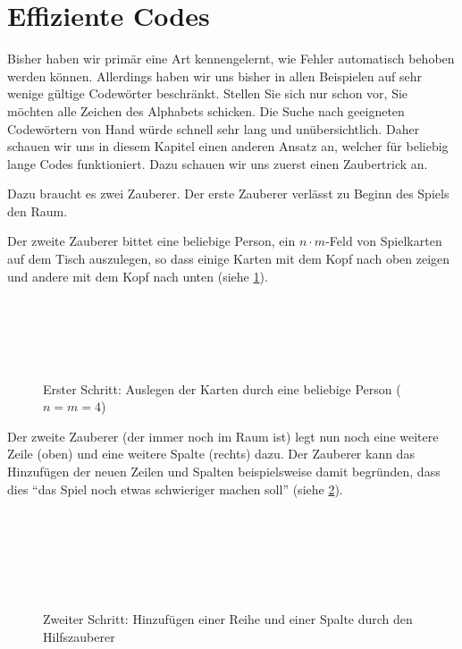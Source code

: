 \section{Effiziente Codes}

Bisher haben wir primär eine Art kennengelernt, wie Fehler automatisch behoben werden können. Allerdings haben wir uns bisher in allen Beispielen auf sehr wenige gültige Codewörter beschränkt. Stellen Sie sich nur schon vor, Sie möchten alle Zeichen des Alphabets schicken. Die Suche nach geeigneten Codewörtern von Hand würde schnell sehr lang und unübersichtlich. Daher schauen wir uns in diesem Kapitel einen anderen Ansatz an, welcher für beliebig lange Codes funktioniert. Dazu schauen wir uns zuerst einen Zaubertrick an.

Dazu braucht es zwei Zauberer. Der erste Zauberer verlässt zu Beginn des Spiels den Raum.

Der zweite Zauberer bittet eine beliebige Person, ein $n\cdot m$-Feld von Spielkarten auf dem Tisch auszulegen, so dass einige Karten mit dem Kopf nach oben zeigen und andere mit dem Kopf nach unten (siehe \cref{fig:zauberer-1}).

\begin{figure}[H]
    \centering
    \\
    \\
    \\
    \\
    \caption{Erster Schritt: Auslegen der Karten durch eine beliebige Person ($n=m=4$)}
    \label{fig:zauberer-1}
\end{figure}


Der zweite Zauberer (der immer noch im Raum ist) legt nun noch eine weitere Zeile (oben) und eine weitere Spalte (rechts) dazu. Der Zauberer kann das Hinzufügen der neuen Zeilen und Spalten beispielsweise damit begründen, dass dies \enquote{das Spiel noch etwas schwieriger machen soll} (siehe \cref{fig:zauberer-2}).

\begin{figure}[H]
    \centering
    \\
    \\
    \\
    \\
    \\
    \caption{Zweiter Schritt: Hinzufügen einer Reihe und einer Spalte durch den Hilfszauberer}
    \label{fig:zauberer-2}
\end{figure}

